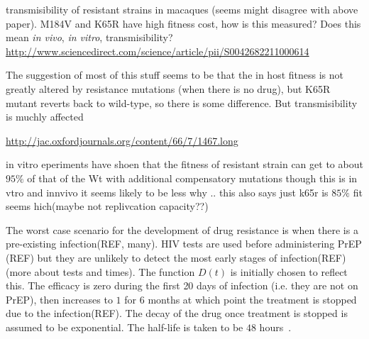 \documentclass[DIV=15]{scrartcl}
\begin{document}
transmisibility of resistant strains in macaques (seems might disagree with above paper). M184V and K65R have high fitness cost, how is this measured? Does this mean \textit{in vivo}, \textit{in vitro}, transmisibility?
\url{http://www.sciencedirect.com/science/article/pii/S0042682211000614}

The suggestion of most of this stuff seems to be that the in host fitness is not greatly altered by resistance mutations (when there is no drug), but    K65R mutant reverts back to wild-type, so there is some difference. But transmisibility is muchly affected \cite{chateau2013}

\url{http://jac.oxfordjournals.org/content/66/7/1467.long}
  
  in vitro  eperiments have shoen that the  fitness of resistant strain can get to about $95\%$ of that of the Wt with additional compensatory mutations though this is in vtro and innvivo it seems likely to be less why .. this also says just k65r is $85\%$ fit seems hich(maybe not replivcation capacity??)~\cite{Svarovskaia2008}
  





The worst case scenario for the development of drug resistance is  when there is a pre-existing infection(REF, many).  HIV tests are used before  administering PrEP (REF) but they are unlikely to detect the  most early stages of infection(REF)(more about tests and times). The function $D(t)$ is initially chosen to reflect this. The efficacy  is zero during the first 20 days of infection (i.e. they are not on PrEP), then increases to $1$ for $6$ months at which point the treatment is stopped due to the infection(REF). The decay of the drug once treatment  is  stopped is assumed to be exponential. The half-life is taken to be 
$48$ hours~\cite{patterson2011}.
\end{document}
